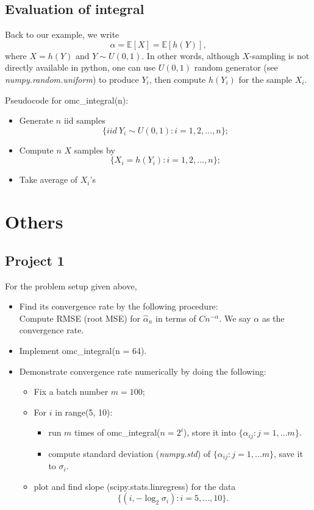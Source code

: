 \documentclass{article}
\begin{document}
\subsection{Evaluation of integral}
Back to our example, we write
$$\alpha = \mathbb E[X] = \mathbb E[h(Y)],$$
where $X = h(Y)$ and $Y\sim U(0,1)$.
In other words, although $X$-sampling is not directly available in python, 
one can use $U(0,1)$ random generator (see {\it numpy.random.uniform}) to produce $Y_i$, then compute $h(Y_i)$ for 
the sample $X_i$.

Pseudocode for omc\_integral(n):
\begin{itemize}
\item Generate $n$ iid samples $$\{iid \ Y_i\sim U(0,1): i = 1, 2, \ldots, n\};$$
\item Compute $n$ $X$ samples by
$$\{X_i = h(Y_i): i = 1, 2, \ldots, n\};$$
\item Take average of $X_i$'s
\end{itemize}

\section{Others}
\subsection{Project 1}
 For the problem setup given above, 
\begin{itemize}
 \item Find its convergence rate by the following procedure: \\
 Compute RMSE (root MSE) for $\hat \alpha_n$ in terms of $C n^{-\alpha}$.
 We say $\alpha$ as the convergence rate.
 \item Implement omc\_integral(n = 64).
 \item Demonstrate convergence rate numerically by doing the following:
\begin{itemize}
 \item Fix a batch number $m=100$;
 \item For $i$ in range(5, 10): 
\begin{itemize}
 \item run  $m$ times of omc\_integral($n=2^i$), store it into $\{\alpha_{ij}: j = 1, \ldots m\}.$
 \item compute standard deviation ({\it numpy.std}) of $\{\alpha_{ij}: j = 1, \ldots m\}$, save it to $\sigma_i$.
\end{itemize}
\item plot and find slope (scipy.stats.linregress)  for the data
$$\{(i, -\log_2 \sigma_i): i = 5, \ldots, 10\}.$$
\end{itemize}

\end{itemize}
\end{document}
